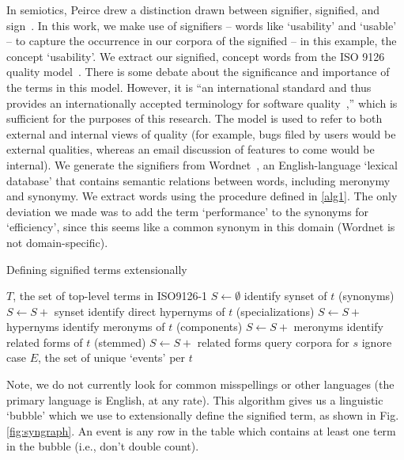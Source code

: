 \documentclass[conference, compsoc]{IEEEtran}
\begin{document}
In semiotics, Peirce drew a distinction drawn between signifier, signified, and sign~\cite{atkin2006}. In this work, we make use of signifiers -- words like `usability' and `usable' -- to capture the occurrence in our corpora of the signified -- in this example, the concept `usability'. We extract our signified, concept words from the ISO 9126 quality model~\cite{iso9126}. There is some debate about the significance and importance of the terms in this model. However, it is ``an international standard and thus provides an internationally accepted terminology for software quality~\cite[p. 58]{Boegh2008},'' which is sufficient for the purposes of this research. The model is used to refer to both external and internal views of quality (for example, bugs filed by users would be external qualities, whereas an email discussion of features to come would be internal). We generate the signifiers from Wordnet~\cite{Fellbaum1998}, an English-language `lexical database' that contains semantic relations between words, including meronymy and synonymy. We extract words using the procedure defined in \ref{alg1}. The only deviation we made was to add the term `performance' to the synonyms for `efficiency', since this seems like a common synonym in this domain (Wordnet is not domain-specific). %

\renewcommand{\algorithmiccomment}[1]{// #1}
\begin{algorithm}[H]
\caption{Defining signified terms extensionally}
  \label{alg1}
\begin{algorithmic}
	\REQUIRE $T$, the set of top-level terms in ISO9126-1
	\STATE $S \leftarrow \emptyset $
	\STATE identify synset of $t$ (synonyms)%
	\STATE $S \leftarrow S +$ synset
	\STATE identify direct hypernyms of $t$ (specializations)%
	\STATE $S \leftarrow S +$ hypernyms %
	\STATE identify meronyms of $t$ (components)%
	\STATE $S \leftarrow S +$ meronyms %
	\STATE identify related forms of $t$ (stemmed)%
	\STATE $S \leftarrow S +$ related forms
		\STATE query corpora for $s$
		\COMMENT ignore case
	\ENDFOR
  \ENDFOR
\RETURN $E$, the set of unique `events' per $t$

\end{algorithmic}
\end{algorithm}
Note, we do not currently look for common misspellings or other languages (the primary language is English, at any rate). This algorithm gives us a linguistic `bubble' which we use to extensionally define the signified term, as shown in Fig. \ref{fig:syngraph}. An event is any row in the table which contains at least one term in the bubble (i.e., don't double count). 
\end{document}
